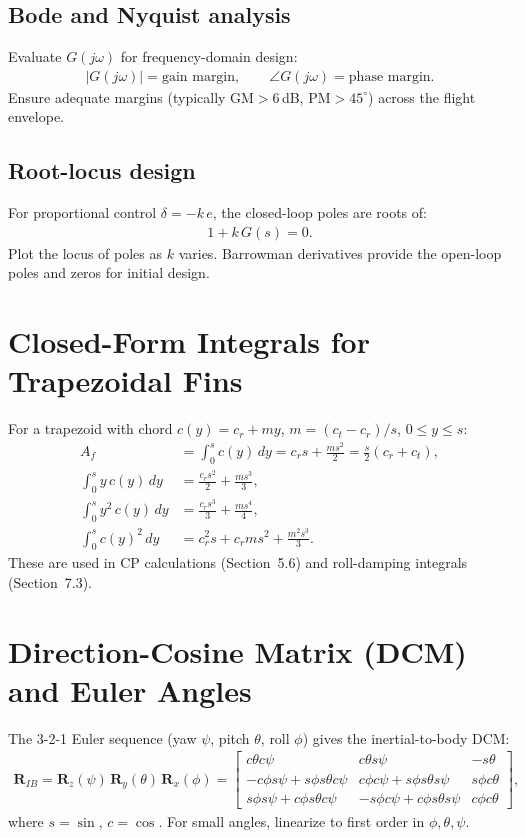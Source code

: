 \documentclass[11pt]{article}
\begin{document}
\subsection{Bode and Nyquist analysis}
Evaluate $G(j\omega)$ for frequency-domain design:
\begin{align}
|G(j\omega)| = \text{gain margin},\qquad
\angle G(j\omega) = \text{phase margin}.
\end{align}
Ensure adequate margins (typically GM$>6\,$dB, PM$>45^\circ$) across the flight envelope.

\subsection{Root-locus design}
For proportional control $\delta = -k\,e$, the closed-loop poles are roots of:
\begin{align}
1 + k\,G(s) = 0.
\end{align}
Plot the locus of poles as $k$ varies. Barrowman derivatives provide the open-loop poles and zeros for initial design.

\appendix

\section{Closed-Form Integrals for Trapezoidal Fins}

For a trapezoid with chord $c(y)=c_r+my$, $m=(c_t-c_r)/s$, $0\le y\le s$:
\begin{align}
A_f &= \int_0^s c(y)\,dy = c_r s + \frac{ms^2}{2} = \frac{s}{2}(c_r+c_t),\\
\int_0^s y\,c(y)\,dy &= \frac{c_r s^2}{2} + \frac{ms^3}{3},\\
\int_0^s y^2\,c(y)\,dy &= \frac{c_r s^3}{3} + \frac{ms^4}{4},\\
\int_0^s c(y)^2\,dy &= c_r^2 s + c_r m s^2 + \frac{m^2 s^3}{3}.
\end{align}
These are used in CP calculations (Section~5.6) and roll-damping integrals (Section~7.3).

\section{Direction-Cosine Matrix (DCM) and Euler Angles}

The 3-2-1 Euler sequence (yaw $\psi$, pitch $\theta$, roll $\phi$) gives the inertial-to-body DCM:
\begin{align}
\mathbf{R}_{IB} = \mathbf{R}_z(\psi)\,\mathbf{R}_y(\theta)\,\mathbf{R}_x(\phi)
= \begin{bmatrix}
c\theta c\psi & c\theta s\psi & -s\theta\\
-c\phi s\psi + s\phi s\theta c\psi & c\phi c\psi + s\phi s\theta s\psi & s\phi c\theta\\
s\phi s\psi + c\phi s\theta c\psi & -s\phi c\psi + c\phi s\theta s\psi & c\phi c\theta
\end{bmatrix},
\end{align}
where $s=\sin$, $c=\cos$. For small angles, linearize to first order in $\phi,\theta,\psi$.
\end{document}
